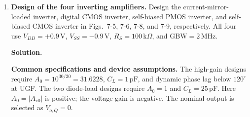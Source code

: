 \documentclass[12pt,letterpaper]{article}
\newcommand{\kohm}{\,\mathrm{k}\Omega}
\newcommand{\V}{\,\mathrm{V}}
\newcommand{\MHz}{\,\mathrm{MHz}}
\newcommand{\pF}{\,\mathrm{pF}}
\begin{document}
\begin{enumerate}
For $A_0\gg1$, negligible $C_A$, and a dominant Miller time constant,
\[
f_{p1}\approx\frac{1}{2\pi A_0R_AC_C},\qquad
\mathrm{GBW}\approx A_0f_{p1}
\approx\frac{1}{2\pi R_AC_C}.
\]
For $R_A=100\kohm$ and $\mathrm{GBW}=2\MHz$, this gives
\[
C_C\approx0.7958\,\mathrm{pF}.
\]
This is the total feedback capacitance, including $C_{gd}$; the external
$C_m$ is smaller by the relevant parasitic capacitance.
The full two-node expression provides the corresponding refinement.

\textbf{(d) Frequency and phase conventions.}
When $a^2\geq4b$, the two real poles are at
$s=-\omega_{p1}$ and $s=-\omega_{p2}$, where
\[
\omega_{p1}=\frac{2}{a+\sqrt{a^2-4b}},\qquad
\omega_{p2}=\frac{a+\sqrt{a^2-4b}}{2b},\qquad
f_{pi}=\frac{\omega_{pi}}{2\pi}.
\]
Define the measured bandwidth $f_{\mathrm{BW}}$ by
$|H(j2\pi f_{\mathrm{BW}})|=A_0/\sqrt{2}$.
It is approximately $f_{p1}$ only when the other pole and the zero
are sufficiently far away. The measured gain--bandwidth product is
$\mathrm{GBW}=A_0f_{\mathrm{BW}}$, while the unity-gain frequency
satisfies $|H(j2\pi f_{\mathrm{UGF}})|=1$.

After removing the DC inversion, the dynamic phase lag is
\[
\phi_{\mathrm{lag}}(f)=
\tan^{-1}\!\left(\frac{f}{f_{p1}}\right)+
\tan^{-1}\!\left(\frac{f}{f_{p2}}\right)+
\tan^{-1}\!\left(\frac{f}{f_z}\right).
\]
The RHP zero adds phase lag. Therefore,
$f_{p2}\geq\sqrt{3}\,\mathrm{GBW}$ alone guarantees neither the exact
UGF nor a lag below $120^\circ$ when the zero is appreciable.
For a monotone low-pass buffer with $A_0=1$, a positive-frequency
unity-gain crossing need not exist. The buffer phase is therefore
evaluated at $f_{\mathrm{BW}}$, as specified in the handout.

\newpage
\item \textbf{Design of the four inverting amplifiers.}
Design the current-mirror-loaded inverter, digital CMOS inverter,
self-biased PMOS inverter, and self-biased CMOS inverter in
Figs.~7-5, 7-6, 7-8, and 7-9, respectively.
All four use $V_{DD}=+0.9\V$, $V_{SS}=-0.9\V$,
$R_S=100\kohm$, and $\mathrm{GBW}=2\MHz$.

\textbf{Solution.}

\textbf{Common specifications and device assumptions.}
The high-gain designs require $A_0=10^{30/20}=31.6228$,
$C_L=1\pF$, and dynamic phase lag below $120^\circ$ at UGF.
The two diode-load designs require $A_0=1$ and $C_L=25\pF$.
Here $A_0=|A_{v0}|$ is positive; the voltage gain is negative.
The nominal output is selected as $V_{o,Q}=0$.


\end{enumerate}
\end{document}
